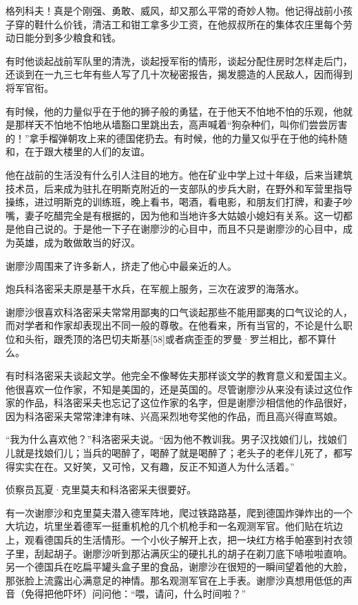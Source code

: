 格列科夫！真是个刚强、勇敢、威风，却又那么平常的奇妙人物。他记得战前小孩子穿的鞋什么价钱，清洁工和钳工拿多少工资，在他叔叔所在的集体农庄里每个劳动日能分到多少粮食和钱。

有时他谈起战前军队里的清洗，谈起授军衔的情形，谈起分配住房时怎样走后门，还谈到在一九三七年有些人写了几十次秘密报告，揭发臆造的人民敌人，因而得到将军官衔。

有时候，他的力量似乎在于他的狮子般的勇猛，在于他天不怕地不怕的乐观，他就是那样天不怕地不怕地从墙豁口里跳出去，高声喊着“狗杂种们，叫你们尝尝厉害的！”拿手榴弹朝攻上来的德国佬扔去。有时候，他的力量又似乎在于他的纯朴随和，在于跟大楼里的人们的友谊。

他在战前的生活没有什么引人注目的地方。他在矿业中学上过十年级，后来当建筑技术员，后来成为驻扎在明斯克附近的一支部队的步兵大尉，在野外和军营里指导操练，进过明斯克的训练班，晚上看书，喝酒，看电影，和朋友们打牌，和妻子吵嘴，妻子吃醋完全是有根据的，因为他和当地许多大姑娘小媳妇有关系。这一切都是他自己说的。于是他一下子在谢廖沙的心目中，而且不只是谢廖沙的心目中，成为英雄，成为敢做敢当的好汉。

谢廖沙周围来了许多新人，挤走了他心中最亲近的人。

炮兵科洛密采夫原是基干水兵，在军舰上服务，三次在波罗的海落水。

谢廖沙很喜欢科洛密采夫常常用鄙夷的口气谈起那些不能用鄙夷的口气议论的人，而对学者和作家却表现出不同一般的尊敬。在他看来，所有当官的，不论是什么职位和头衔，跟秃顶的洛巴切夫斯基[58]或者病歪歪的罗曼·罗兰相比，都不算什么。

有时科洛密采夫谈起文学。他完全不像琴佐夫那样谈文学的教育意义和爱国主义。他很喜欢一位作家，不知是美国的，还是英国的。尽管谢廖沙从来没有读过这位作家的作品，科洛密采夫也忘记了这位作家的名字，但是谢廖沙相信他的作品很好，因为科洛密采夫常常津津有味、兴高采烈地夸奖他的作品，而且高兴得直骂娘。

“我为什么喜欢他？”科洛密采夫说。“因为他不教训我。男子汉找娘们儿，找娘们儿就是找娘们儿；当兵的喝醉了，喝醉了就是喝醉了；老头子的老伴儿死了，都写得实实在在。又好笑，又可怜，又有趣，反正不知道人为什么活着。”

侦察员瓦夏·克里莫夫和科洛密采夫很要好。

有一次谢廖沙和克里莫夫潜入德军阵地，爬过铁路路基，爬到德国炸弹炸出的一个大坑边，坑里坐着德军一挺重机枪的几个机枪手和一名观测军官。他们贴在坑边上，观看德国兵的生活情形。一个小伙子解开上衣，把一块红方格手帕塞到衬衣领子里，刮起胡子。谢廖沙听到那沾满灰尘的硬扎扎的胡子在剃刀底下哧啦啦直响。另一个德国兵在吃扁平罐头盒子里的食品，谢廖沙在很短的一瞬间望着他的大脸，那张脸上流露出心满意足的神情。那名观测军官在上手表。谢廖沙真想用低低的声音（免得把他吓坏）问问他：“喂，请问，什么时间啦？”

